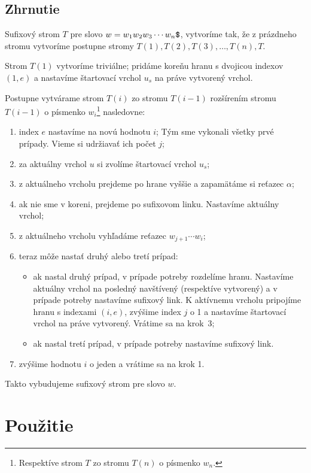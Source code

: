 \subsection{Zhrnutie}

Sufixový strom $T$ pre slovo $w = w_1w_2w_3\cdots w_n\hbox{\tt\$}$, vytvoríme tak, že z 
prázdneho stromu vytvoríme postupne stromy $T(1), T(2), T(3),\ldots, T(n), T$. 

Strom $T(1)$ vytvoríme triviálne; pridáme koreňu hranu s dvojicou indexov 
$(1, e)$ a nastavíme štartovací vrchol $u_s$ na práve vytvorený vrchol.

Postupne vytvárame strom $T(i)$ zo stromu $T(i-1)$ rozšírením stromu 
$T(i-1)$ o písmenko $w_i$\footnote{Respektíve strom $T$ zo stromu 
$T(n)$ o písmenko $w_n$.} nasledovne:

\begin{enumerate}
\item index $e$ nastavíme na novú hodnotu $i$; 
Tým sme vykonali všetky prvé prípady. Vieme si udržiavať ich počet $j$;
\item za aktuálny vrchol $u$ si zvolíme štartovací vrchol $u_s$;
\item z aktuálneho vrcholu prejdeme po hrane vyššie a zapamätáme si reťazec 
$\alpha$;
\item ak nie sme v koreni, prejdeme po sufixovom linku. Nastavíme aktuálny 
vrchol;
\item z aktuálneho vrcholu vyhľadáme reťazec $w_{j+1}\cdots w_i$;
\item teraz môže nastať druhý alebo tretí prípad:
\begin{itemize}
\item ak nastal druhý prípad, v prípade potreby rozdelíme hranu. Nastavíme 
aktuálny vrchol na posledný navštívený (respektíve vytvorený) a v prípade 
potreby nastavíme sufixový link. K aktívnemu vrcholu pripojíme hranu s 
indexami $(i,e)$, zvýšime index $j$ o 1 a nastavíme štartovací vrchol na 
práve vytvorený. Vrátime sa na krok~3;
\item ak nastal tretí prípad, v prípade potreby nastavíme sufixový link.
\end{itemize}
\item zvýšime hodnotu $i$ o jeden a vrátime sa na krok 1.
\end{enumerate}
 
Takto vybudujeme sufixový strom pre slovo $w$.

\section{Použitie}\label{sec:sx:usage}

